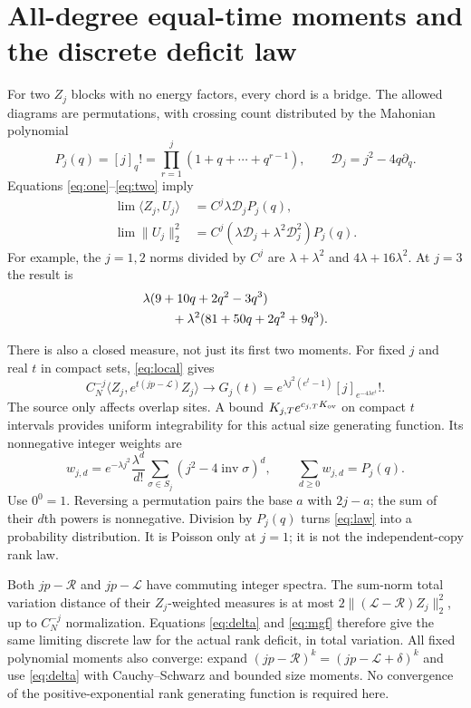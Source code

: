 \documentclass[11pt]{article}
\newcommand{\RR}{\mathcal R}
\newcommand{\LL}{\mathcal L}
\newcommand{\inv}{\operatorname{inv}}
\newcommand{\mathscr}{\mathcal}
\begin{document}
\newpage
\section{All-degree equal-time moments and the discrete deficit law}
For two $Z_j$ blocks with no energy factors, every chord is a bridge.
The allowed diagrams are permutations, with crossing count distributed
by the Mahonian polynomial
\begin{equation}
 P_j(q)=[j]_q!=\prod_{r=1}^j(1+q+\cdots+q^{r-1}),
 \qquad \mathscr D_j=j^2-4q\partial_q.
\end{equation}
Equations \eqref{eq:one}--\eqref{eq:two} imply
\begin{align}
 \lim\langle Z_j,U_j\rangle&=C^j\lambda\mathscr D_jP_j(q),\\
 \lim\|U_j\|_2^2&=C^j(\lambda\mathscr D_j+
                       \lambda^2\mathscr D_j^2)P_j(q).\label{eq:norm}
\end{align}
For example, the $j=1,2$ norms divided by $C^j$ are
$\lambda+\lambda^2$ and $4\lambda+16\lambda^2$.
At $j=3$ the result is
\begin{align}
 &\lambda(9+10q+2q^2-3q^3)\notag\\
 &\hspace{8mm}+\lambda^2(81+50q+2q^2+9q^3).
\end{align}

There is also a closed measure, not just its first two moments.
For fixed $j$ and real $t$ in compact sets, \eqref{eq:local} gives
\begin{equation}
 C_N^{-j}\langle Z_j,e^{t(jp-\LL)}Z_j\rangle
 \longrightarrow G_j(t)=
 e^{\lambda j^2(e^t-1)}[j]_{e^{-4\lambda e^t}}! .\label{eq:mgf}
\end{equation}
The source only affects overlap sites. A bound
$K_{j,T}e^{c_{j,T}K_{\rm ov}}$ on compact $t$ intervals provides
uniform integrability for this actual size generating function.
Its nonnegative integer weights are
\begin{equation}
 w_{j,d}=e^{-\lambda j^2}\frac{\lambda^d}{d!}
     \sum_{\sigma\in S_j}(j^2-4\inv\sigma)^d,
 \qquad \sum_{d\ge0}w_{j,d}=P_j(q).\label{eq:law}
\end{equation}
Use $0^0=1$. Reversing a permutation pairs the base $a$ with $2j-a$;
the sum of their $d$th powers is nonnegative. Division by $P_j(q)$
turns \eqref{eq:law} into a probability distribution. It is Poisson
only at $j=1$; it is not the independent-copy rank law.

Both $jp-\RR$ and $jp-\LL$ have commuting integer spectra.
The sum-norm total variation distance of their $Z_j$-weighted measures
is at most $2\|(\LL-\RR)Z_j\|_2^2$, up to $C_N^{-j}$ normalization.
Equations \eqref{eq:delta} and \eqref{eq:mgf} therefore give the same
limiting discrete law for the actual rank deficit, in total variation.
All fixed polynomial moments also converge: expand
$(jp-\RR)^k=(jp-\LL+\delta)^k$ and use \eqref{eq:delta} with
Cauchy--Schwarz and bounded size moments. No convergence of the
positive-exponential rank generating function is required here.
\end{document}
